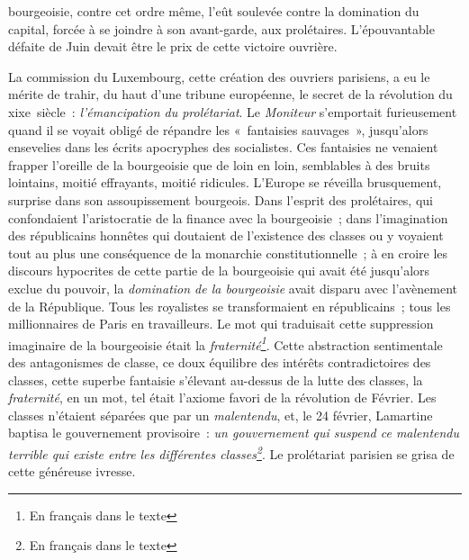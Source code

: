 \documentclass[french,twoside]{book} %
\begin{document}
bourgeoisie, contre cet ordre même, l’eût soulevée contre la domination du capital, forcée à se joindre à son avant-garde, aux prolétaires. L’épouvantable défaite de Juin devait être le prix de cette victoire ouvrière.\par
La commission du Luxembourg, cette création des ouvriers parisiens, a eu le mérite de trahir, du haut d’une tribune européenne, le secret de la révolution du xixe siècle : \emph{l’émancipation du prolétariat}. Le \emph{Moniteur} s’emportait furieusement quand il se voyait obligé de répandre les « fantaisies sauvages », jusqu’alors ensevelies dans les écrits apocryphes des socialistes. Ces fantaisies ne venaient frapper l’oreille de la bourgeoisie que de loin en loin, semblables à des bruits lointains, moitié effrayants, moitié ridicules. L’Europe se réveilla brusquement, surprise dans son assoupissement bourgeois. Dans l’esprit des prolétaires, qui confondaient l’aristocratie de la finance avec la bourgeoisie ; dans l’imagination des républicains honnêtes qui doutaient de l’existence des classes ou y voyaient tout au plus une conséquence de la monarchie constitutionnelle ; à en croire les discours hypocrites de cette partie de la bourgeoisie qui avait été jusqu’alors exclue du pouvoir, la \emph{domination de la bourgeoisie} avait disparu avec l’avènement de la République. Tous les royalistes se transformaient en républicains ; tous les millionnaires de Paris en travailleurs. Le mot qui traduisait cette suppression imaginaire de la bourgeoisie était la \emph{fraternité\footnote{En français dans le texte}}. Cette abstraction sentimentale des antagonismes de classe, ce doux équilibre des intérêts contradictoires des classes, cette superbe fantaisie s’élevant au-dessus de la lutte des classes, la \emph{fraternité}, en un mot, tel était l’axiome favori de la révolution de Février. Les classes n’étaient séparées que par un \emph{malentendu}, et, le 24 février, Lamartine baptisa le gouvernement provisoire : \emph{un gouvernement qui suspend ce malentendu terrible qui existe entre les différentes classes\footnote{En français dans le texte}}. Le prolétariat parisien se grisa de cette généreuse ivresse.\par
\end{document}

